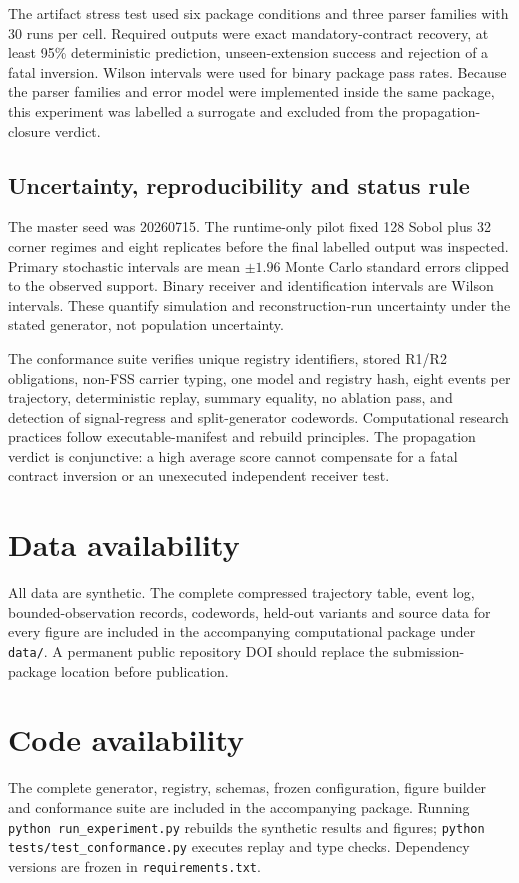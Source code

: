 \documentclass[10pt]{article}
\begin{document}
The artifact stress test used six package conditions and three parser families with 30 runs per cell. Required outputs were exact mandatory-contract recovery, at least 95\% deterministic prediction, unseen-extension success and rejection of a fatal inversion. Wilson intervals were used for binary package pass rates\citep{wilson1927}. Because the parser families and error model were implemented inside the same package, this experiment was labelled a surrogate and excluded from the propagation-closure verdict.

\subsection*{Uncertainty, reproducibility and status rule}
The master seed was 20260715. The runtime-only pilot fixed 128 Sobol plus 32 corner regimes and eight replicates before the final labelled output was inspected. Primary stochastic intervals are mean $\pm1.96$ Monte Carlo standard errors clipped to the observed support. Binary receiver and identification intervals are Wilson intervals. These quantify simulation and reconstruction-run uncertainty under the stated generator, not population uncertainty.

The conformance suite verifies unique registry identifiers, stored R1/R2 obligations, non-FSS carrier typing, one model and registry hash, eight events per trajectory, deterministic replay, summary equality, no ablation pass, and detection of signal-regress and split-generator codewords. Computational research practices follow executable-manifest and rebuild principles\citep{sandve2013}. The propagation verdict is conjunctive: a high average score cannot compensate for a fatal contract inversion or an unexecuted independent receiver test.

\section*{Data availability}
All data are synthetic. The complete compressed trajectory table, event log, bounded-observation records, codewords, held-out variants and source data for every figure are included in the accompanying computational package under \texttt{data/}. A permanent public repository DOI should replace the submission-package location before publication.

\section*{Code availability}
The complete generator, registry, schemas, frozen configuration, figure builder and conformance suite are included in the accompanying package. Running \texttt{python run\_experiment.py} rebuilds the synthetic results and figures; \texttt{python tests/test\_conformance.py} executes replay and type checks. Dependency versions are frozen in \texttt{requirements.txt}.
\end{document}
